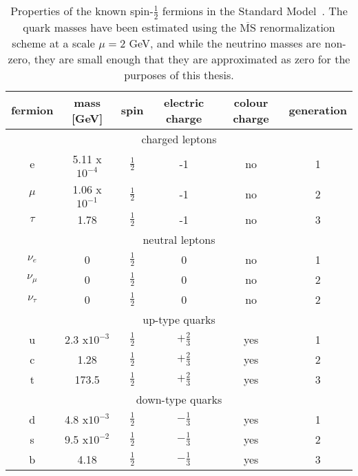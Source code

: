 \begin{table}
  \centering
  \begin{tabular}{ |c|c|c|c|c|c|}
  \hline
   fermion & mass [GeV] & spin & electric charge & colour charge & generation \\
  \hline
  \multicolumn{6}{|c|}{charged leptons} \\
  \hline
    e    & 5.11 x$10^{-4}$ & $\frac{1}{2}$ & -1 & no & 1 \\
  $\mu$  & 1.06 x$10^{-1}$  & $\frac{1}{2}$ & -1 & no & 2 \\
  $\tau$ & 1.78            & $\frac{1}{2}$ & -1 & no & 3 \\
  \hline
  \multicolumn{6}{|c|}{neutral leptons} \\
  \hline
  $\nu_e$      & 0 & $\frac{1}{2}$ & 0 & no & 1 \\
  $\nu_{\mu}$  & 0 & $\frac{1}{2}$ & 0 & no & 2 \\
  $\nu_{\tau}$ & 0 & $\frac{1}{2}$ & 0 & no & 2 \\
  \hline
  \multicolumn{6}{|c|}{up-type quarks} \\
  \hline
  u & 2.3 x$10^{-3}$ & $\frac{1}{2}$ & $+\frac{2}{3}$ & yes & 1 \\ 
  c & 1.28           & $\frac{1}{2}$ & $+\frac{2}{3}$ & yes & 2 \\
  t & 173.5          & $\frac{1}{2}$ & $+\frac{2}{3}$ & yes & 3 \\
  \hline
  \multicolumn{6}{|c|}{down-type quarks} \\
  \hline
  d & 4.8 x$10^{-3}$ & $\frac{1}{2}$ & $-\frac{1}{3}$ & yes & 1 \\
  s & 9.5 x$10^{-2}$ & $\frac{1}{2}$ & $-\frac{1}{3}$ & yes & 2 \\
  b & 4.18           & $\frac{1}{2}$ & $-\frac{1}{3}$ & yes & 3 \\
  \hline
  \end{tabular}
  \caption[Properties of known spin-$\frac{1}{2}$ bosons in the Standard Model.]
        {\small Properties of the known spin-$\frac{1}{2}$ fermions in the Standard Model~\cite{PDG}.  The quark masses have been estimated using the $\overline{\mathrm{MS}}$ renormalization scheme at a scale $\mu = 2$ GeV, and while the neutrino masses are non-zero, they are small enough that they are approximated as zero for the purposes of this thesis.}
\label{table:Fermions}
\end{table}


